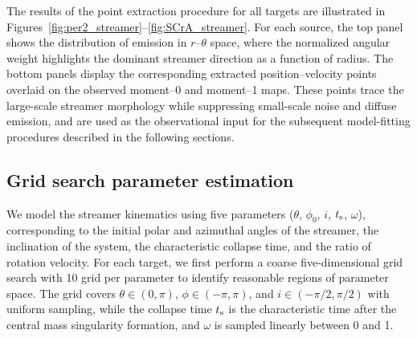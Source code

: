 The results of the point extraction procedure for all targets are illustrated in Figures~\ref{fig:per2_streamer}--\ref{fig:SCrA_streamer}. For each source, the top panel shows the distribution of emission in $r$--$\theta$ space, where the normalized angular weight highlights the dominant streamer direction as a function of radius. The bottom panels display the corresponding extracted position--velocity points
overlaid on the observed moment--0 and moment--1 maps. These points trace the large-scale streamer morphology while suppressing small-scale noise and diffuse emission, and are used as the observational input for the subsequent model-fitting procedures described in the following sections.

\subsection{Grid search parameter estimation}
We model the streamer kinematics using five parameters ($\theta$, $\phi_0$, $i$, $t_{\rm s}$, $\omega$), corresponding to the initial polar and azimuthal angles of the streamer, the inclination of the system, the characteristic collapse time, and the ratio of rotation velocity. 
For each target, we first perform a coarse five-dimensional grid search with 10 grid per parameter to identify reasonable regions of parameter space. The grid covers $\theta \in (0, \pi)$, $\phi \in (-\pi, \pi)$, and $i \in (-\pi/2, \pi/2)$ with uniform sampling, while the collapse time $t_{\rm s}$ is the characteristic time after the central mass singularity formation, and $\omega$ is sampled linearly between 0 and 1.

